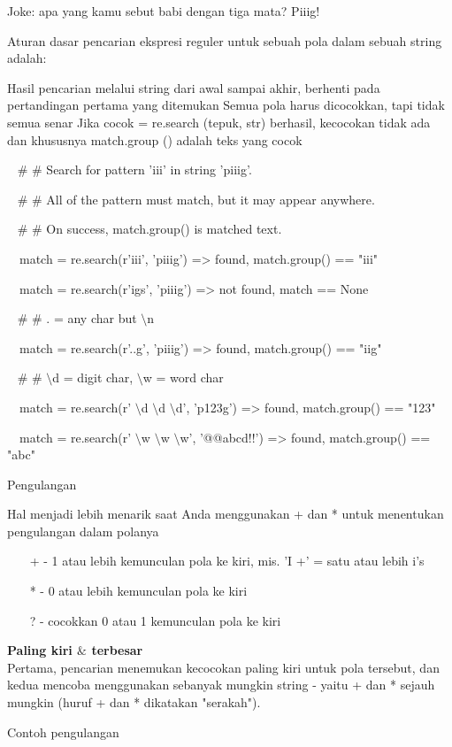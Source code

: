 \begin {enumerate}
\begin {enumerate}
Joke: apa yang kamu sebut babi dengan tiga mata? Piiig!

Aturan dasar pencarian ekspresi reguler untuk sebuah pola dalam sebuah string adalah:

Hasil pencarian melalui string dari awal sampai akhir, berhenti pada pertandingan pertama yang ditemukan  Semua pola harus dicocokkan, tapi tidak semua senar Jika cocok = re.search (tepuk, str) berhasil, kecocokan tidak ada dan khususnya match.group () adalah teks yang cocok

~  $  \#  $ $  \#  $ Search for pattern 'iii' in string 'piiig'.

~  $  \#  $ $  \#  $ All of the pattern must match, but it may appear anywhere.

~  $  \#  $ $  \#  $ On success, match.group() is matched text.

~~match = re.search(r'iii', 'piiig') =>  found, match.group() == "iii"

~~match = re.search(r'igs', 'piiig') =>  not found, match == None

~  $  \#  $ $  \#  $ . = any char but  $  \setminus  $n

~~match = re.search(r'..g', 'piiig') =>  found, match.group() == "iig"

~  $  \#  $ $  \#  $  $  \setminus  $d = digit char,  $  \setminus  $w = word char

~~match = re.search(r' $  \setminus  $d $  \setminus  $d $  \setminus  $d', 'p123g') =>  found, match.group() == "123"

~~match = re.search(r' $  \setminus  $w $  \setminus  $w $  \setminus  $w', '@@abcd!!') =>  found, match.group() == "abc"

Pengulangan

Hal menjadi lebih menarik saat Anda menggunakan + dan * untuk menentukan pengulangan dalam polanya

~~~ + - 1 atau lebih kemunculan pola ke kiri, mis. 'I +' = satu atau lebih i's

~~~ * - 0 atau lebih kemunculan pola ke kiri

~~~ ? - cocokkan 0 atau 1 kemunculan pola ke kiri

{\fontsize{14pt}{14pt}\selectfont \textbf{Paling kiri  $  \&  $ terbesar} \\}
Pertama, pencarian menemukan kecocokan paling kiri untuk pola tersebut, dan kedua mencoba menggunakan sebanyak mungkin string - yaitu + dan * sejauh mungkin (huruf + dan * dikatakan "serakah").

Contoh pengulangan


\end{enumerate}
\end{enumerate}
